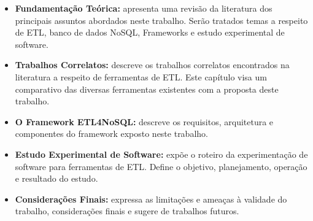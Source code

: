 \begin{itemize}
	\item \textbf{Fundamentação Teórica:} apresenta uma revisão da literatura dos principais assuntos abordados neste trabalho. Serão tratados temas a respeito de ETL, banco de dados NoSQL, Frameworks e estudo experimental de software.
	
	\item \textbf{Trabalhos Correlatos:} descreve os trabalhos correlatos encontrados na literatura a respeito de ferramentas de ETL. Este capítulo visa um comparativo das diversas ferramentas existentes com a proposta deste trabalho.
	
	\item \textbf{O Framework ETL4NoSQL:} descreve os requisitos, arquitetura e componentes do framework exposto neste trabalho.
	
	\item \textbf{Estudo Experimental de Software:} expõe o roteiro da experimentação de software para ferramentas de ETL. Define o objetivo, planejamento, operação e resultado do estudo.
	
	\item \textbf{Considerações Finais:} expressa as limitações e ameaças à validade do trabalho, considerações finais e sugere de trabalhos futuros.	
	
\end{itemize}

